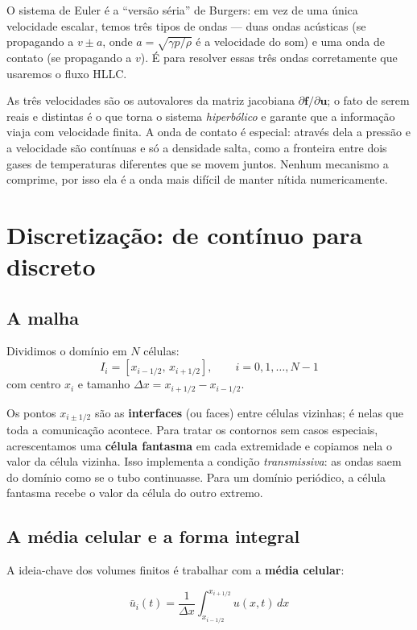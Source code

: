 \documentclass[10pt,a4paper]{article}
\newcommand{\ub}{\bar u}
\newcommand{\vu}{\mathbf{u}}
\newcommand{\vf}{\mathbf{f}}
\begin{document}
\begin{intuicao}
O sistema de Euler é a ``versão séria'' de Burgers: em vez de uma única velocidade escalar, temos três tipos de ondas --- duas ondas acústicas (se propagando a $v\pm a$, onde $a=\sqrt{\gamma p/\rho}$ é a velocidade do som) e uma onda de contato (se propagando a $v$). É para resolver essas três ondas corretamente que usaremos o fluxo HLLC.

As três velocidades são os autovalores da matriz jacobiana $\partial\vf/\partial\vu$; o fato de serem reais e distintas é o que torna o sistema \emph{hiperbólico} e garante que a informação viaja com velocidade finita. A onda de contato é especial: através dela a pressão e a velocidade são contínuas e só a densidade salta, como a fronteira entre dois gases de temperaturas diferentes que se movem juntos. Nenhum mecanismo a comprime, por isso ela é a onda mais difícil de manter nítida numericamente.
\end{intuicao}

\section{Discretização: de contínuo para discreto}

\subsection{A malha}

Dividimos o domínio em $N$ células:
\[
I_i=[x_{i-1/2},\,x_{i+1/2}],\qquad i=0,1,\dots,N-1
\]
com centro $x_i$ e tamanho $\Delta x=x_{i+1/2}-x_{i-1/2}$.

Os pontos $x_{i\pm1/2}$ são as \textbf{interfaces} (ou faces) entre células vizinhas; é nelas que toda a comunicação acontece. Para tratar os contornos sem casos especiais, acrescentamos uma \textbf{célula fantasma} em cada extremidade e copiamos nela o valor da célula vizinha. Isso implementa a condição \emph{transmissiva}: as ondas saem do domínio como se o tubo continuasse. Para um domínio periódico, a célula fantasma recebe o valor da célula do outro extremo.

\subsection{A média celular e a forma integral}

A ideia-chave dos volumes finitos é trabalhar com a \textbf{média celular}:
\begin{destaque}
\begin{equation}\label{eq:media}
\ub_i(t)=\frac{1}{\Delta x}\int_{x_{i-1/2}}^{x_{i+1/2}}u(x,t)\,dx
\end{equation}
\end{destaque}
\end{document}
